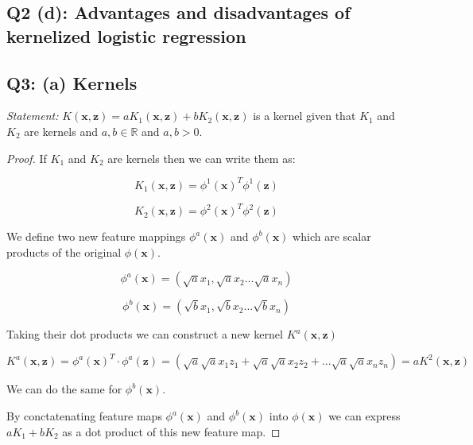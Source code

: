 \documentclass[11pt]{amsart}
\newcommand{\vek}[1]{\mathbf{#1}}
\begin{document}
\subsection{Q2 (d): Advantages and disadvantages of kernelized logistic regression}

\subsection{Q3: (a) Kernels}

{\it Statement:} $K(\vek{x}, \vek{z}) = aK_1(\vek{x}, \vek{z}) + bK_{2}(\vek{x}, \vek{z})$ is a kernel given that $K_1$ and $K_2$ are kernels and $a,b \in \mathbb{R}$ and $a, b > 0$.

\begin{proof}

If $K_1$ and $K_2$ are kernels then we can write them as:

\begin{equation}
K_1(\vek{x}, \vek{z}) = \phi^1(\vek{x})^T\phi^1(\vek{z})
\end{equation}

\begin{equation}
K_2(\vek{x}, \vek{z}) = \phi^2(\vek{x})^T\phi^2(\vek{z})
\end{equation}


We define two new feature mappings $\phi^a(\vek{x})$ and $\phi^b(\vek{x})$ which are scalar products of the original $\phi(\vek{x})$.

\begin{equation}
\phi^a(\vek{x}) = (\sqrt{a}x_1, \sqrt{a}x_2...\sqrt{a}x_n)
\end{equation}

\begin{equation}
\phi^b(\vek{x}) = (\sqrt{b}x_1, \sqrt{b}x_2...\sqrt{b}x_n)
\end{equation}

Taking their dot products we can construct a new kernel $K^a(\vek{x}, \vek{z})$

\begin{equation}
K^a(\vek{x}, \vek{z}) = \phi^a(\vek{x})^T \cdot \phi^a(\vek{z}) = (\sqrt{a}\sqrt{a}x_1 z_1 + \sqrt{a}\sqrt{a}x_2 z_2 + ... \sqrt{a}\sqrt{a}x_n z_n ) = aK^2(\vek{x}, \vek{z})
\end{equation}

We can do the same for $\phi^b({\vek{x}})$.

By conctatenating feature maps $\phi^{a}(\vek{x})$ and $\phi^{b}(\vek{x})$ into $\phi(\vek{x})$ we can express $aK_1 + bK_2$ as a dot product of this new feature map.


\end{proof}
\end{document}
